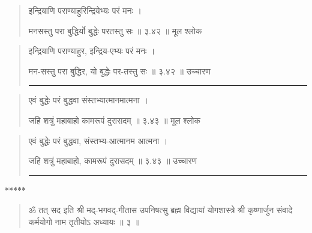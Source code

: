 \begin{quotation}

इन्द्रियाणि पराण्याहुरिन्द्रियेभ्यः परं मनः  ।  

मनसस्तु परा बुद्धिर्यो बुद्धेः परतस्तु सः  ॥ ३.४२ ॥  मूल श्लोक
\end{quotation}

\begin{quotation}

इन्द्रियाणि पराण्याहुर, इन्द्रिय-एभ्यः परं मनः  ।  

मन-सस्तु परा बुद्धिर, यो बुद्धेः पर-तस्तु सः  ॥ ३.४२ ॥  उच्चारण

\noindent\rule{16cm}{0.4pt} 
\end{quotation}


\begin{quotation}

एवं बुद्धेः परं बुद्धवा संस्तभ्यात्मानमात्मना  ।  

जहि शत्रुं महाबाहो कामरूपं दुरासदम्‌  ॥ ३.४३ ॥  मूल श्लोक
\end{quotation}

\begin{quotation}

एवं बुद्धेः परं बुद्धवा, संस्तभ्य-आत्मानम आत्मना  ।  

जहि शत्रुं महाबाहो, कामरूपं दुरासदम्‌  ॥ ३.४३ ॥  उच्चारण

\noindent\rule{16cm}{0.4pt} 
\end{quotation}





\begin{center} ***** \end{center}
\begin{quotation}
ॐ तत् सद इति श्री मद्-भगवद्-गीतास उपनिषत्सु ब्रह्म विद्यायां योगशास्त्रे श्री कृष्णार्जुन संवादे कर्मयोगो नाम तृतीयोऽ अध्यायः  ॥  ३  ॥ 
\end{quotation}


